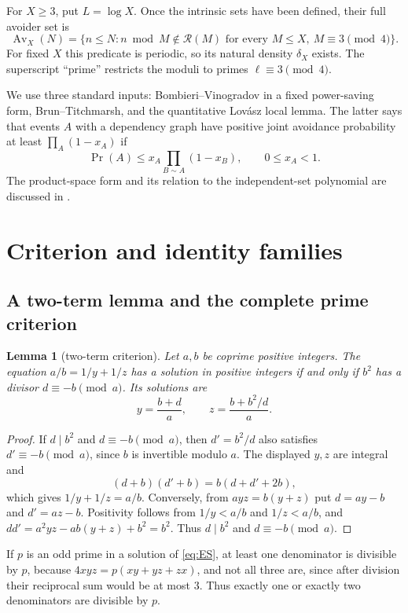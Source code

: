 \documentclass[10pt,reqno]{amsart}
\newtheorem{lemma}[theorem]{Lemma}
\theoremstyle{definition}
\newcommand{\Rcal}{\mathscr R}
\newcommand{\Av}{\operatorname {Av}}
\newcommand{\1}{\mathbf 1}
\begin{document}
For $X\geq3$, put $L=\log X$.  Once the intrinsic sets have been defined, their full avoider set is
\begin{equation}\label{eq:Av-def}
 \Av_X(N)=\{n\leq N:n\bmod M\notin\Rcal(M)
       \text{ for every }M\leq X,\ M\equiv3\pmod4\}.
\end{equation}
For fixed $X$ this predicate is periodic, so its natural density $\delta_X$ exists.  The superscript ``prime'' restricts the moduli to primes $\ell\equiv3\pmod4$.

We use three standard inputs: Bombieri--Vinogradov in a fixed power-saving form, Brun--Titchmarsh, and the quantitative Lov\'asz local lemma.  The latter says that events $A$ with a dependency graph have positive joint avoidance probability at least $\prod_A(1-x_A)$ if
\[
 \Pr(A)\leq x_A\prod_{B\sim A}(1-x_B),\qquad 0\leq x_A<1.
\]
The product-space form and its relation to the independent-set polynomial are discussed in \cite{ScottSokal}.

\section{Criterion and identity families}\label{sec:criterion}

\subsection{A two-term lemma and the complete prime criterion}
\begin{lemma}[two-term criterion]\label{lem:two-term}
Let $a,b$ be coprime positive integers.  The equation $a/b=1/y+1/z$ has a solution in positive integers if and only if $b^2$ has a divisor $d\equiv-b\pmod a$.  Its solutions are
\[
 y=\frac{b+d}{a},\qquad z=\frac{b+b^2/d}{a}.
\]
\end{lemma}
\begin{proof}
If $d\mid b^2$ and $d\equiv-b\pmod a$, then $d'=b^2/d$ also satisfies $d'\equiv-b\pmod a$, since $b$ is invertible modulo $a$.  The displayed $y,z$ are integral and
\[
 (d+b)(d'+b)=b(d+d'+2b),
\]
which gives $1/y+1/z=a/b$.  Conversely, from $ayz=b(y+z)$ put $d=ay-b$ and $d'=az-b$.  Positivity follows from $1/y<a/b$ and $1/z<a/b$, and
$dd'=a^2yz-ab(y+z)+b^2=b^2$.  Thus $d\mid b^2$ and $d\equiv-b\pmod a$.
\end{proof}

If $p$ is an odd prime in a solution of \eqref{eq:ES}, at least one denominator is divisible by $p$, because $4xyz=p(xy+yz+zx)$, and not all three are, since after division their reciprocal sum would be at most $3$.  Thus exactly one or exactly two denominators are divisible by $p$.
\end{document}
